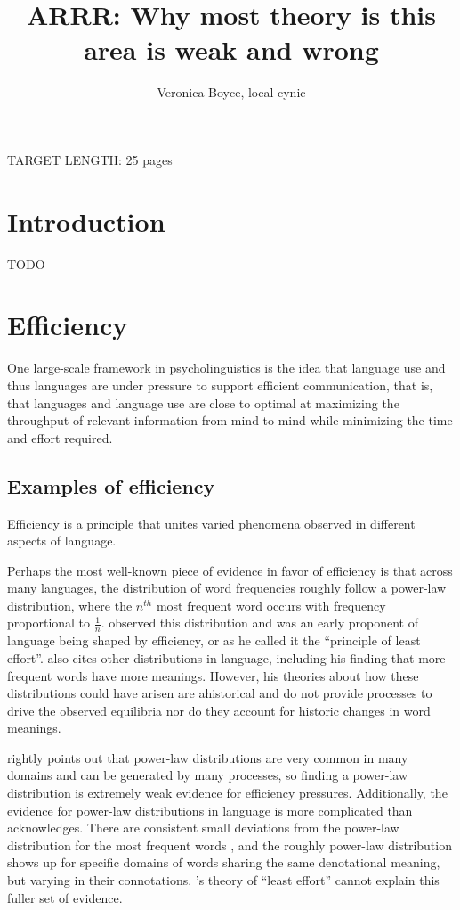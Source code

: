 \documentclass[]{article}
\title{ARRR: Why most theory is this area is weak and wrong}
\author{Veronica Boyce, local cynic}
\begin{document}
\maketitle



	


	
TARGET LENGTH: 25 pages
	


\section{Introduction}

TODO
	



\section{Efficiency}
One large-scale framework in psycholinguistics is the idea that language use and thus languages are under pressure to support efficient communication, that is, that languages and language use are close to optimal at maximizing the throughput of relevant information from mind to mind while minimizing the time and effort required. 

\subsection{Examples of efficiency}
Efficiency is a principle that unites varied phenomena observed in different aspects of language. 

Perhaps the most well-known piece of evidence in favor of efficiency is that across many languages, the distribution of word frequencies roughly follow a power-law distribution, where the $n^{th}$ most frequent word occurs with frequency proportional to $\frac{1}{n}$. \cite{zipf1949} observed this distribution and was an early proponent of language being shaped by efficiency, or as he called it the ``principle of least effort''. \cite{zipf1949} also cites other distributions in language, including his finding that more frequent words have more meanings. However, his theories about how these distributions could have arisen are ahistorical and do not provide processes to drive the observed equilibria nor do they account for historic changes in word meanings. 

\cite{piantadosi2014} rightly points out that power-law distributions are very common in many domains and can be generated by many processes, so finding a power-law distribution is extremely weak evidence for efficiency pressures. Additionally, the evidence for power-law distributions in language is more complicated than \cite{zipf1949} acknowledges. There are consistent small deviations from the power-law distribution for the most frequent words \cite{piantadosi2014}, and the roughly power-law distribution shows up for specific domains of words sharing the same denotational meaning, but varying in their connotations. \cite{zipf1949}'s theory of ``least effort'' cannot explain this fuller set of evidence. 
\end{document}
